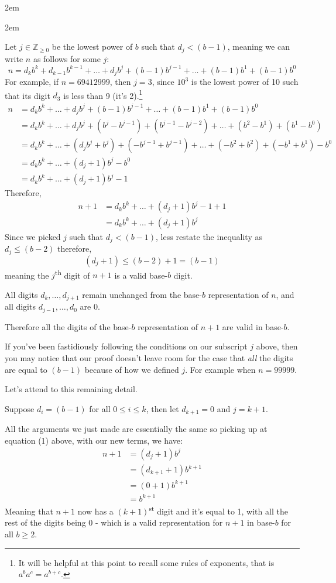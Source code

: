 \documentclass{article}
\newenvironment{jprIn}{\begin{adjustwidth}{2em}{}}{\end{adjustwidth}}
\begin{document}
\begin{jprIn}
\begin{jprIn}

Let $j\in \mathbb{Z}_{\ge 0}$ be the lowest power of $b$ such that $d_j<(b-1)$,
meaning we can write $n$ as follows for some $j$:
\[n = d_kb^k+d_{k-1}b^{k-1}+\dots+d_jb^j+(b-1)b^{j-1}+\dots+(b-1)b^1+(b-1)b^0\]
For example,
if $n=69412999$,
then $j=3$,
since $10^3$ is the lowest power of 10 such that its digit $d_3$ is less than 9 (it's 2).\footnote{It will
be helpful at this point to recall some rules of exponents, that is $a^ba^c=a^{b+c}$.}
\begin{align*}
n &=d_kb^k+\dots+d_jb^j+(b-1)b^{j-1}+\dots+(b-1)b^1+(b-1)b^0\\
&= d_kb^k+\dots+d_jb^j+(b^j-b^{j-1})+(b^{j-1}-b^{j-2})+\dots+(b^2-b^1)+(b^1-b^0)\\
&= d_kb^k+\dots+(d_jb^j+b^j)+(-b^{j-1}+b^{j-1})+\dots+(-b^2+b^2)+(-b^1+b^1)-b^0\\
&= d_kb^k+\dots+(d_j+1)b^j-b^0\\
&= d_kb^k+\dots+(d_j+1)b^j-1
\end{align*}
Therefore,
\begin{align}
n+1 &=d_kb^k+\dots+(d_j+1)b^j-1+1 \nonumber \\
&= d_kb^k+\dots+(d_j+1)b^j \label{eqnA}
\end{align}
Since we picked $j$ such that $d_j<(b-1)$,
less restate the inequality as\\
$d_j\le(b-2)$ therefore,
\[(d_j+1)\le(b-2)+1=(b-1)\]
meaning the $j$\textsuperscript{th} digit of $n+1$ is a valid base-$b$ digit.

All digits $d_k,\dots,{}d_{j+1}$ remain unchanged from the base-$b$ representation of $n$,
and all digits $d_{j-1},\dots{},d_0$ are 0.

Therefore all the digits of the base-$b$ representation of $n+1$ are valid in base-$b$.
\bigskip

If you've been fastidiously following the conditions on our subscript $j$ above, then
you may notice that
our proof doesn't leave room for the case that \emph{all} the digits are equal to $(b-1)$ because of
how we defined $j$. For example when $n=99999$.

Let's attend to this remaining detail.

Suppose $d_i=(b-1)$ for all $0\le{}i\le{}k$, then let $d_{k+1}=0$ and $j=k+1$.

All the arguments we just made are essentially the same so picking up at equation (1) above, with our new terms, we have:
\begin{align*}
n+1 &=(d_j+1)b^j\\
&=(d_{k+1}+1)b^{k+1}\\
&=(0+1)b^{k+1}\\
&=b^{k+1}
\end{align*}
Meaning that $n+1$ now has a $(k+1)$\textsuperscript{st} digit and it's equal to 1,
with all the rest of the digits being 0 - which is a valid representation for $n+1$ in base-$b$ for all $b\ge2$.


\end{jprIn}
\end{jprIn}
\end{document}
